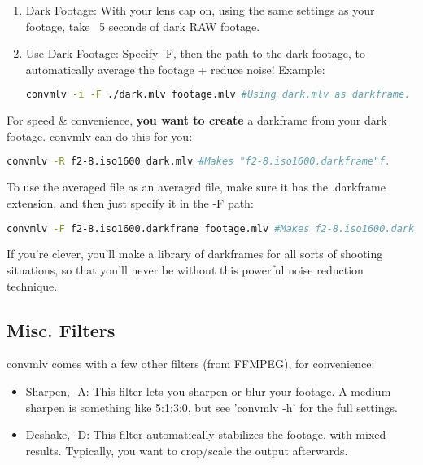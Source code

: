 \documentclass[a4paper,12pt]{article}
\begin{document}
		\begin{enumerate}
			\item Dark Footage: With your lens cap on, using the same settings as your footage, take ~5 seconds of dark RAW footage.
			\item Use Dark Footage: Specify -F, then the path to the dark footage, to automatically average the footage + reduce noise! Example:
\begin{lstlisting}[language=bash]
	convmlv -i -F ./dark.mlv footage.mlv #Using dark.mlv as darkframe.
\end{lstlisting}
		\end{enumerate}
		
		For speed \& convenience, \textbf{you want to create} a darkframe from your dark footage. convmlv can do this for you:
		
\begin{lstlisting}[language=bash]
	convmlv -R f2-8.iso1600 dark.mlv #Makes "f2-8.iso1600.darkframe"f.
\end{lstlisting}
		
		To use the averaged file as an averaged file, make sure it has the .darkframe extension, and then just specify it in the -F path:
		
\begin{lstlisting}[language=bash]
	convmlv -F f2-8.iso1600.darkframe footage.mlv #Makes f2-8.iso1600.darkframe.
\end{lstlisting}
		
		If you're clever, you'll make a library of darkframes for all sorts of shooting situations, so that you'll never
		be without this powerful noise reduction technique.
	
	\subsection{Misc. Filters}
		convmlv comes with a few other filters (from FFMPEG), for convenience:
		
		\begin{itemize}
			\item Sharpen, -A: This filter lets you sharpen or blur your footage. A medium sharpen is something like 5:1:3:0, but 
			see 'convmlv -h' for the full settings.
			\item Deshake, -D: This filter automatically stabilizes the footage, with mixed results. Typically, you want to crop/scale the output
			afterwards.
		\end{itemize}
		
\end{document}
